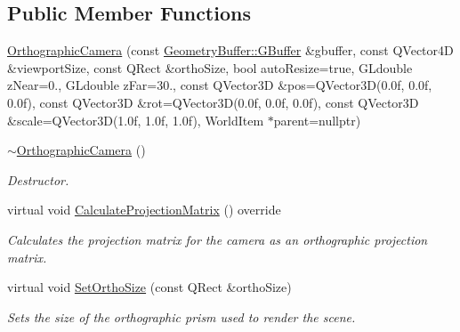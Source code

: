 \subsection*{Public Member Functions}
\begin{DoxyCompactItemize}
\item 
\mbox{\hyperlink{class_geometry_engine_1_1_geometry_world_item_1_1_geometry_camera_1_1_orthographic_camera_ac5fa7a59a777876bba9725944adcaaf3}{Orthographic\+Camera}} (const \mbox{\hyperlink{class_geometry_engine_1_1_geometry_buffer_1_1_g_buffer}{Geometry\+Buffer\+::\+G\+Buffer}} \&gbuffer, const Q\+Vector4D \&viewport\+Size, const Q\+Rect \&ortho\+Size, bool auto\+Resize=true, G\+Ldouble z\+Near=0., G\+Ldouble z\+Far=30., const Q\+Vector3D \&pos=Q\+Vector3D(0.\+0f, 0.\+0f, 0.\+0f), const Q\+Vector3\+D \&rot=\+Q\+Vector3\+D(0.\+0f, 0.\+0f, 0.\+0f), const Q\+Vector3\+D \&scale=\+Q\+Vector3\+D(1.\+0f, 1.\+0f, 1.\+0f), World\+Item $\ast$parent=nullptr)
\item 
\mbox{\label{class_geometry_engine_1_1_geometry_world_item_1_1_geometry_camera_1_1_orthographic_camera_a71d2d206d04a1d8169e4dd861c306c5d}} 
\mbox{\hyperlink{class_geometry_engine_1_1_geometry_world_item_1_1_geometry_camera_1_1_orthographic_camera_a71d2d206d04a1d8169e4dd861c306c5d}{$\sim$\+Orthographic\+Camera}} ()
\begin{DoxyCompactList}\small\item\em Destructor. \end{DoxyCompactList}\item 
\mbox{\label{class_geometry_engine_1_1_geometry_world_item_1_1_geometry_camera_1_1_orthographic_camera_a123a6673acd7a3ceb0ae32b31be4eaaf}} 
virtual void \mbox{\hyperlink{class_geometry_engine_1_1_geometry_world_item_1_1_geometry_camera_1_1_orthographic_camera_a123a6673acd7a3ceb0ae32b31be4eaaf}{Calculate\+Projection\+Matrix}} () override
\begin{DoxyCompactList}\small\item\em Calculates the projection matrix for the camera as an orthographic projection matrix. \end{DoxyCompactList}\item 
\mbox{\label{class_geometry_engine_1_1_geometry_world_item_1_1_geometry_camera_1_1_orthographic_camera_a64f264486365cb44043d0dfd5d2772c5}} 
virtual void \mbox{\hyperlink{class_geometry_engine_1_1_geometry_world_item_1_1_geometry_camera_1_1_orthographic_camera_a64f264486365cb44043d0dfd5d2772c5}{Set\+Ortho\+Size}} (const Q\+Rect \&ortho\+Size)
\begin{DoxyCompactList}\small\item\em Sets the size of the orthographic prism used to render the scene. \end{DoxyCompactList}\end{DoxyCompactItemize}
